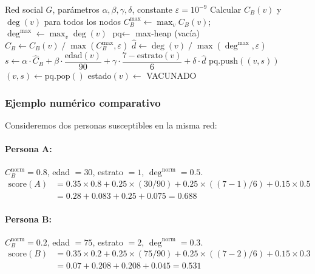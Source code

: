 \documentclass[spanish,notitlepage,letterpaper, 12pt]{article}
\begin{document}
\begin{algorithm}[H]
\caption{Vacunaci\'on H\'ibrida}
\small
\begin{algorithmic}[1]
\Require Red social $G$, par\'ametros $\alpha, \beta, \gamma, \delta$, constante $\varepsilon = 10^{-9}$
\State Calcular $C_B(v)$ y $\deg(v)$ para todos los nodos 
\State $C_B^{\max} \gets \max_v C_B(v)$; \quad $\deg^{\max} \gets \max_v \deg(v)$
\State $\text{pq} \gets$ max-heap (vac\'ia)
    \State $\hat{C}_B \gets C_B(v) \;/\; \max(C_B^{\max}, \varepsilon)$
    \State $\hat{d} \gets \deg(v) \;/\; \max(\deg^{\max}, \varepsilon)$
    \State $s \gets \alpha \cdot \hat{C}_B + \beta \cdot \dfrac{\text{edad}(v)}{90} + \gamma \cdot \dfrac{7 - \text{estrato}(v)}{6} + \delta \cdot \hat{d}$
    \State $\text{pq}.\text{push}((v, s))$
\EndFor
{}
    \State $(v, s) \gets \text{pq}.\text{pop}()$
    \State estado$(v) \gets$ VACUNADO
\EndFor
\end{algorithmic}
\end{algorithm}

\subsubsection{Ejemplo num\'erico comparativo}

Consideremos dos personas susceptibles en la misma red:

\paragraph{Persona A:} $C_B^{\text{norm}} = 0.8$, edad $= 30$, estrato $= 1$, $\deg^{\text{norm}} = 0.5$.
\begin{align*}
\text{score}(A) &= 0.35 \times 0.8 + 0.25 \times (30/90) + 0.25 \times ((7-1)/6) + 0.15 \times 0.5 \\
&= 0.28 + 0.083 + 0.25 + 0.075 = 0.688
\end{align*}

\paragraph{Persona B:} $C_B^{\text{norm}} = 0.2$, edad $= 75$, estrato $= 2$, $\deg^{\text{norm}} = 0.3$.
\begin{align*}
\text{score}(B) &= 0.35 \times 0.2 + 0.25 \times (75/90) + 0.25 \times ((7-2)/6) + 0.15 \times 0.3 \\
&= 0.07 + 0.208 + 0.208 + 0.045 = 0.531
\end{align*}
\end{document}
